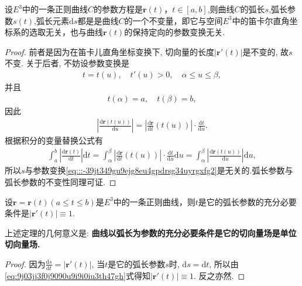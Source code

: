\documentclass[../../main.tex]{subfiles}%
\begin{document}
\begin{theorem}
设$E^3$中的一条正则曲线$C$的参数方程是$\bm{r}(t)$，$t\in[a,b]$,则曲线$C$的弧长$s$,弧长参数$s(t)$,弧长元素$\mathrm{d}s$都是是曲线$C$的一个不变量，即它与空间$E^3$中的笛卡尔直角坐标系的选取无关，也与曲线$\bm{r}(t)$的保持定向的参数变换无关.
\end{theorem}
\begin{proof}
前者是因为在笛卡儿直角坐标变换下, 切向量的长度$|\bm{r}'(t)|$是不变的, 故$s$不变. 关于后者, 不妨设参数变换是
\begin{align}
t = t(u),\quad t'(u) > 0,\quad \alpha \leqslant u \leqslant \beta,
\label{eq:::-39jt349gu9ejg8eu4gpdrsg34uyrgxfg2}
\end{align}
并且
\begin{align*}
t(\alpha) = a,\quad t(\beta) = b,
\end{align*}
因此
\begin{align}
\left| \frac{\mathrm{d}\bm{r}(t(u))}{\mathrm{d}u} \right| = \left| \frac{\mathrm{d}\bm{r}}{\mathrm{d}t}(t(u)) \right| \cdot \frac{\mathrm{d}t}{\mathrm{d}u}.
\label{eq:::-39jt349gu9ejg8eu4gpdrsg34uyrgxfg3}
\end{align}
根据积分的变量替换公式有
\begin{align*}
\int_a^b \left| \frac{\mathrm{d}\bm{r}(t)}{\mathrm{d}t} \right| \mathrm{d}t = \int_\alpha^\beta \left| \frac{\mathrm{d}\bm{r}}{\mathrm{d}t}(t(u)) \right| \cdot \frac{\mathrm{d}t}{\mathrm{d}u} \mathrm{d}u 
= \int_\alpha^\beta \left| \frac{\mathrm{d}\bm{r}(t(u))}{\mathrm{d}u} \right| \mathrm{d}u,
\end{align*}
所以$s$与参数变换\eqref{eq:::-39jt349gu9ejg8eu4gpdrsg34uyrgxfg2}是无关的.弧长参数与弧长参数的不变性同理可证.
\end{proof}

\begin{theorem}\label{theorem:微分几何-定理2.1}
设$\bm{r} = \bm{r}(t)(a \leqslant t \leqslant b)$是$E^3$中的一条正则曲线，则$t$是它的弧长参数的充分必要条件是$|\bm{r}'(t)| \equiv 1$.
\end{theorem}
\begin{remark}
上述定理的几何意义是: \textbf{曲线以弧长为参数的充分必要条件是它的切向量场是单位切向量场.}
\end{remark}
\begin{proof}
因为$\frac{\mathrm{d}s}{\mathrm{d}t} = |\bm{r}'(t)|$, 当$t$是它的弧长参数$s$时, $\mathrm{d}s = \mathrm{d}t$, 所以由\eqref{eq:9j03jj3f0j9090u9i9i0iu3th47gh}式得知$|\bm{r}'(t)| \equiv 1$. 反之亦然.
\end{proof}
\end{document}
